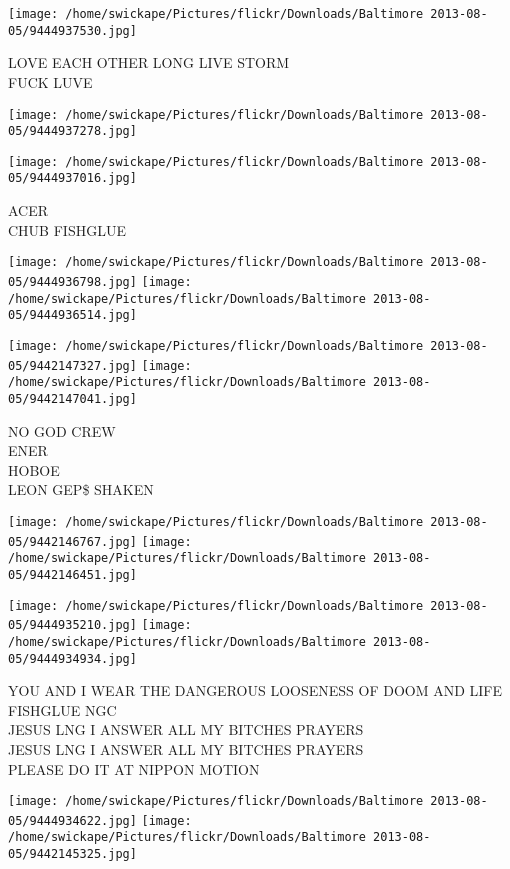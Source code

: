 \documentclass[10pt,letterpaper]{article}
\begin{document}
\vspace{0.25in}
\texttt{[image: /home/swickape/Pictures/flickr/Downloads/Baltimore 2013-08-05/9444937530.jpg]}

LOVE EACH OTHER LONG LIVE STORM\\
FUCK LUVE
\pagebreak

\texttt{[image: /home/swickape/Pictures/flickr/Downloads/Baltimore 2013-08-05/9444937278.jpg]}

\vspace{0.25in}
\texttt{[image: /home/swickape/Pictures/flickr/Downloads/Baltimore 2013-08-05/9444937016.jpg]}

ACER\\
CHUB FISHGLUE
\pagebreak

\texttt{[image: /home/swickape/Pictures/flickr/Downloads/Baltimore 2013-08-05/9444936798.jpg]}
\texttt{[image: /home/swickape/Pictures/flickr/Downloads/Baltimore 2013-08-05/9444936514.jpg]}

\texttt{[image: /home/swickape/Pictures/flickr/Downloads/Baltimore 2013-08-05/9442147327.jpg]}
\texttt{[image: /home/swickape/Pictures/flickr/Downloads/Baltimore 2013-08-05/9442147041.jpg]}

NO GOD CREW\\
ENER\\
HOBOE\\
LEON GEP\$ SHAKEN
\pagebreak

\texttt{[image: /home/swickape/Pictures/flickr/Downloads/Baltimore 2013-08-05/9442146767.jpg]}
\texttt{[image: /home/swickape/Pictures/flickr/Downloads/Baltimore 2013-08-05/9442146451.jpg]}

\texttt{[image: /home/swickape/Pictures/flickr/Downloads/Baltimore 2013-08-05/9444935210.jpg]}
\texttt{[image: /home/swickape/Pictures/flickr/Downloads/Baltimore 2013-08-05/9444934934.jpg]}

YOU AND I WEAR THE DANGEROUS LOOSENESS OF DOOM AND LIFE FISHGLUE NGC\\
JESUS LNG I ANSWER ALL MY BITCHES PRAYERS\\
JESUS LNG I ANSWER ALL MY BITCHES PRAYERS\\
PLEASE DO IT AT NIPPON MOTION
\pagebreak

\texttt{[image: /home/swickape/Pictures/flickr/Downloads/Baltimore 2013-08-05/9444934622.jpg]}
\texttt{[image: /home/swickape/Pictures/flickr/Downloads/Baltimore 2013-08-05/9442145325.jpg]}
\end{document}
